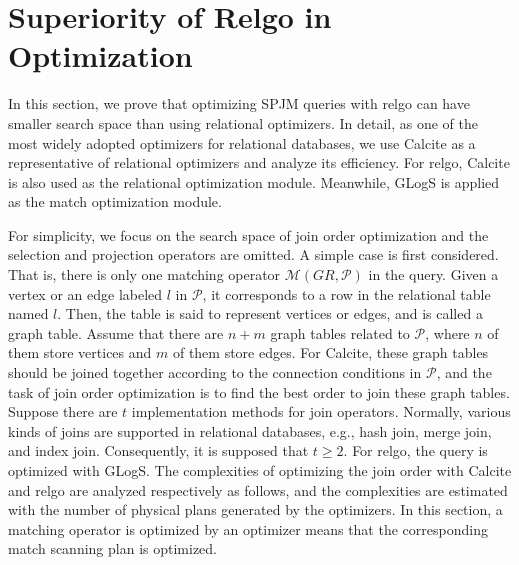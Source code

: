 \section{Superiority of Relgo in Optimization}
\label{sec:theoretical-analysis}

In this section, we prove that optimizing SPJM queries with relgo can have smaller search space than using relational optimizers.
In detail, as one of the most widely adopted optimizers for relational databases, we use Calcite \cite{calcite,columbia} as a representative of relational optimizers and analyze its efficiency.
For relgo, Calcite is also used as the relational optimization module.
Meanwhile, GLogS \cite{GLogS} is applied as the match optimization module.

For simplicity, we focus on the search space of join order optimization and the selection and projection operators are omitted.
A simple case is first considered.
That is, there is only one matching operator $\mathcal{M}(GR, \mathcal{P})$ in the query.
Given a vertex or an edge labeled $l$ in $\mathcal{P}$, it corresponds to a row in the relational table named $l$.
Then, the table is said to represent vertices or edges, and is called a graph table.
Assume that there are $n + m$ graph tables related to $\mathcal{P}$, where $n$ of them store vertices and $m$ of them store edges.
For Calcite, these graph tables should be joined together according to the connection conditions in $\mathcal{P}$, and the task of join order optimization is to find the best order to join these graph tables.
Suppose there are $t$ implementation methods for join operators.
Normally, various kinds of joins are supported in relational databases, e.g., hash join, merge join, and index join.
Consequently, it is supposed that $t \geq 2$.
For relgo, the query is optimized with GLogS.
The complexities of optimizing the join order with Calcite and relgo are analyzed respectively as follows, and the complexities are estimated with the number of physical plans generated by the optimizers.
In this section, a matching operator is optimized by an optimizer means that the corresponding match scanning plan is optimized.



